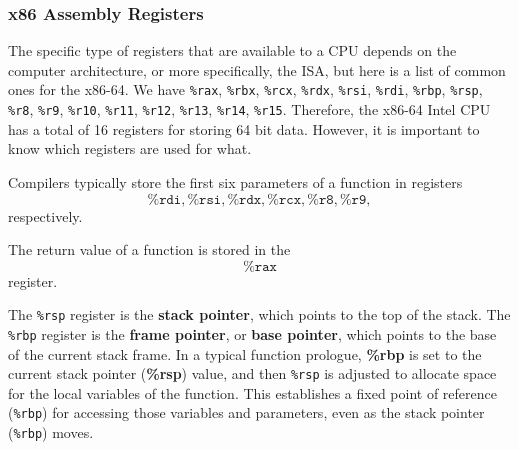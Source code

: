 \documentclass{article}
\begin{document}
    \subsubsection{x86 Assembly Registers}

      The specific type of registers that are available to a CPU depends on the computer architecture, or more specifically, the ISA, but here is a list of common ones for the x86-64. We have \texttt{\%rax}, \texttt{\%rbx}, \texttt{\%rcx}, \texttt{\%rdx}, \texttt{\%rsi}, \texttt{\%rdi}, \texttt{\%rbp}, \texttt{\%rsp}, \texttt{\%r8}, \texttt{\%r9}, \texttt{\%r10}, \texttt{\%r11}, \texttt{\%r12}, \texttt{\%r13}, \texttt{\%r14}, \texttt{\%r15}. Therefore, the x86-64 Intel CPU has a total of 16 registers for storing 64 bit data. However, it is important to know which registers are used for what. 

      \begin{definition}
        Compilers typically store the first six parameters of a function in registers 
        \begin{equation}
          \texttt{\%rdi}, \texttt{\%rsi}, \texttt{\%rdx}, \texttt{\%rcx}, \texttt{\%r8}, \texttt{\%r9}, 
        \end{equation}
        respectively. 
      \end{definition}

      \begin{definition}
        The return value of a function is stored in the 
        \begin{equation}
          \texttt{\%rax} 
        \end{equation}
        register.
      \end{definition}

      \begin{definition}
        The \texttt{\%rsp} register is the \textbf{stack pointer}, which points to the top of the stack. The \texttt{\%rbp} register is the \textbf{frame pointer}, or \textbf{base pointer}, which points to the base of the current stack frame. In a typical function prologue, \textbf{\%rbp} is set to the current stack pointer (\textbf{\%rsp}) value, and then \texttt{\%rsp} is adjusted to allocate space for the local variables of the function. This establishes a fixed point of reference (\texttt{\%rbp}) for accessing those variables and parameters, even as the stack pointer (\texttt{\%rbp}) moves.
      \end{definition}
\end{document}
